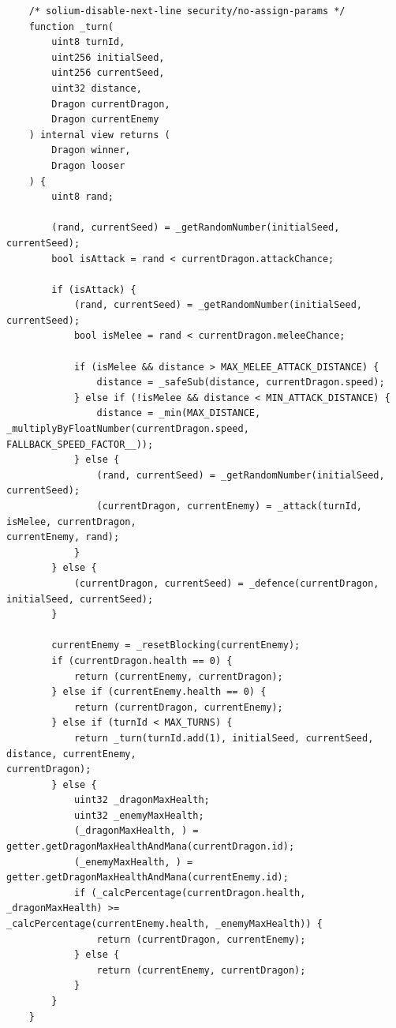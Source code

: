 \documentclass[12pt]{article}
\begin{document}
\begin{footnotesize}
\begin{verbatim}
    /* solium-disable-next-line security/no-assign-params */
    function _turn(
        uint8 turnId,
        uint256 initialSeed,
        uint256 currentSeed,
        uint32 distance,
        Dragon currentDragon,
        Dragon currentEnemy
    ) internal view returns (
        Dragon winner,
        Dragon looser
    ) {
        uint8 rand;

        (rand, currentSeed) = _getRandomNumber(initialSeed, currentSeed);
        bool isAttack = rand < currentDragon.attackChance;

        if (isAttack) {
            (rand, currentSeed) = _getRandomNumber(initialSeed, currentSeed);
            bool isMelee = rand < currentDragon.meleeChance;

            if (isMelee && distance > MAX_MELEE_ATTACK_DISTANCE) {
                distance = _safeSub(distance, currentDragon.speed);
            } else if (!isMelee && distance < MIN_ATTACK_DISTANCE) {
                distance = _min(MAX_DISTANCE, _multiplyByFloatNumber(currentDragon.speed, 
FALLBACK_SPEED_FACTOR__));
            } else {
                (rand, currentSeed) = _getRandomNumber(initialSeed, currentSeed);
                (currentDragon, currentEnemy) = _attack(turnId, isMelee, currentDragon, 
currentEnemy, rand);
            }
        } else {
            (currentDragon, currentSeed) = _defence(currentDragon, initialSeed, currentSeed);
        }

        currentEnemy = _resetBlocking(currentEnemy);
        if (currentDragon.health == 0) {
            return (currentEnemy, currentDragon);
        } else if (currentEnemy.health == 0) {
            return (currentDragon, currentEnemy);
        } else if (turnId < MAX_TURNS) {
            return _turn(turnId.add(1), initialSeed, currentSeed, distance, currentEnemy, 
currentDragon);
        } else {
            uint32 _dragonMaxHealth;
            uint32 _enemyMaxHealth;
            (_dragonMaxHealth, ) = getter.getDragonMaxHealthAndMana(currentDragon.id);
            (_enemyMaxHealth, ) = getter.getDragonMaxHealthAndMana(currentEnemy.id);
            if (_calcPercentage(currentDragon.health, _dragonMaxHealth) >= 
_calcPercentage(currentEnemy.health, _enemyMaxHealth)) {
                return (currentDragon, currentEnemy);
            } else {
                return (currentEnemy, currentDragon);
            }
        }
    }

\end{verbatim}
\end{footnotesize}


\vspace{\baselineskip}

\vspace{\baselineskip}



\end{document}
